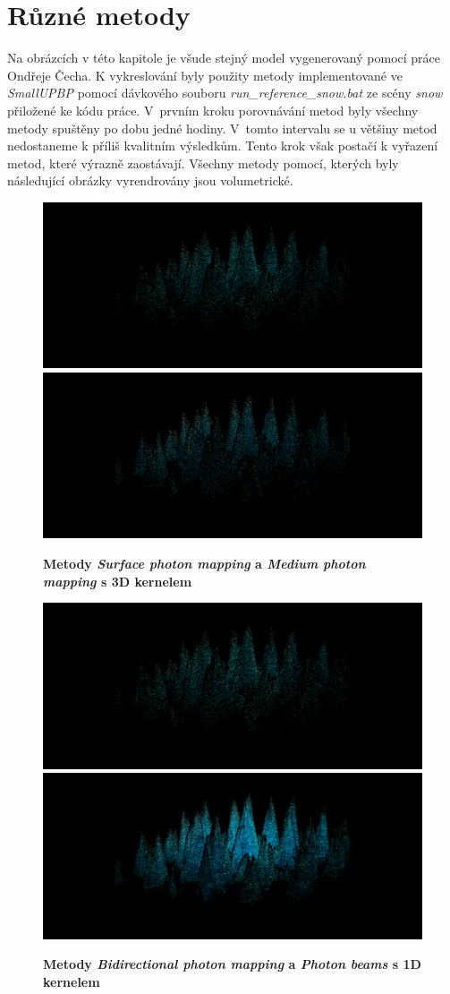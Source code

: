 \section{Různé metody} \label{ruz-met}
Na obrázcích v této kapitole je všude stejný model vygenerovaný pomocí práce Ondřeje Čecha\cite{FITBT22558}. K vykreslování byly použity metody implementované ve \textit{SmallUPBP}\cite{smallubpb} pomocí dávkového souboru \textit{run\_reference\_snow.bat} ze scény \textit{snow} přiložené ke kódu práce. V~prvním kroku porovnávání metod byly všechny metody spuštěny po dobu jedné hodiny. V~tomto intervalu se u většiny metod nedostaneme k příliš kvalitním výsledkům. Tento krok však postačí k vyřazení metod, které výrazně zaostávají. Všechny metody pomocí, kterých byly následující obrázky vyrendrovány jsou volumetrické. 

\begin{figure}[H]\centering

\includegraphics[width=0.5\linewidth]{obrazky-figures/reference_upbp_surf_3600.png}\hfill
\includegraphics[width=0.5\linewidth]{obrazky-figures/reference_upbp_pp3d_3600.png}\hfill
  \caption{\textbf{Metody \textit{Surface photon mapping} a \textit{Medium photon mapping} s 3D kernelem}}
  \label{porovnani1}
\end{figure}
\begin{figure}[H]\centering
\includegraphics[width=0.5\linewidth]{obrazky-figures/reference_upbp_bpm_3600.png}\hfill
\includegraphics[width=0.5\linewidth]{obrazky-figures/reference_upbp_bb1d_3600.png}\hfill
  \caption{\textbf{Metody \textit{Bidirectional photon mapping} a  \textit{Photon beams} s 1D kernelem}}
  \label{porovnani2}
\end{figure}
